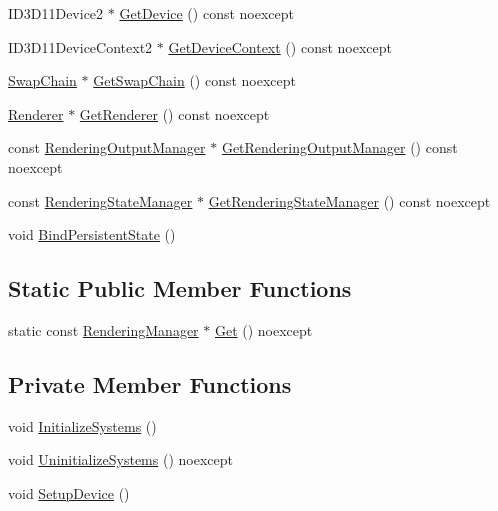 \begin{DoxyCompactItemize}
I\+D3\+D11\+Device2 $\ast$ \hyperlink{classmage_1_1_rendering_manager_a9881f16fe6b212d4650f65e7a273b329}{Get\+Device} () const noexcept
\item 
I\+D3\+D11\+Device\+Context2 $\ast$ \hyperlink{classmage_1_1_rendering_manager_aac3ba0082e34614ce6bcef33fb89ce85}{Get\+Device\+Context} () const noexcept
\item 
\hyperlink{classmage_1_1_swap_chain}{Swap\+Chain} $\ast$ \hyperlink{classmage_1_1_rendering_manager_a867d9d3986a38c98562cf0cfe9797fe0}{Get\+Swap\+Chain} () const noexcept
\item 
\hyperlink{classmage_1_1_renderer}{Renderer} $\ast$ \hyperlink{classmage_1_1_rendering_manager_a5b357f9f7e241945ac396cd09ba3be7e}{Get\+Renderer} () const noexcept
\item 
const \hyperlink{classmage_1_1_rendering_output_manager}{Rendering\+Output\+Manager} $\ast$ \hyperlink{classmage_1_1_rendering_manager_ad24d51b141e5579a3bd8fc63793977fe}{Get\+Rendering\+Output\+Manager} () const noexcept
\item 
const \hyperlink{classmage_1_1_rendering_state_manager}{Rendering\+State\+Manager} $\ast$ \hyperlink{classmage_1_1_rendering_manager_a762283c6474287a874f8e8667f69a165}{Get\+Rendering\+State\+Manager} () const noexcept
\item 
void \hyperlink{classmage_1_1_rendering_manager_adadab213b9aabdc6167a012d340084a6}{Bind\+Persistent\+State} ()
\end{DoxyCompactItemize}
\subsection*{Static Public Member Functions}
\begin{DoxyCompactItemize}
\item 
static const \hyperlink{classmage_1_1_rendering_manager}{Rendering\+Manager} $\ast$ \hyperlink{classmage_1_1_rendering_manager_a920fdd741d160b687ecac1d892f8bfd1}{Get} () noexcept
\end{DoxyCompactItemize}
\subsection*{Private Member Functions}
\begin{DoxyCompactItemize}
\item 
void \hyperlink{classmage_1_1_rendering_manager_a80812ecd5c9757b961e46e6bb7533566}{Initialize\+Systems} ()
\item 
void \hyperlink{classmage_1_1_rendering_manager_a3665d58d2a9e8995a348b5f2bd723d8b}{Uninitialize\+Systems} () noexcept
\item 
void \hyperlink{classmage_1_1_rendering_manager_a45d4cadcd572290f352027b5fa86b4f6}{Setup\+Device} ()
\end{DoxyCompactItemize}
